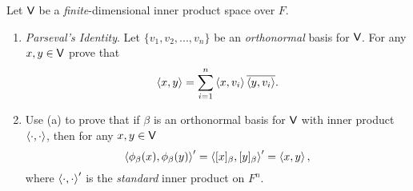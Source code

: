 \begin{exercise} \label{exercise 6.2.15}
Let \(\textsf{V}\) be a \emph{finite}-dimensional inner product space over \(F\).
\begin{enumerate}
\item \emph{Parseval's Identity}.
Let \(\{ v_1, v_2, ..., v_n \}\) be an \emph{orthonormal} basis for \(\textsf{V}\).
For any \(x, y \in \textsf{V}\) prove that
\[
    \left< x, y \right> = \sum_{i = 1}^n \left< x, v_i \right> \overline{\left< y, v_i \right>}.
\]
\item Use (a) to prove that if \(\beta\) is an orthonormal basis for \(\textsf{V}\) with inner product \(\left< \cdot, \cdot \right>\), then for any \(x, y \in \textsf{V}\)
\[
    \left< \phi_{\beta}(x), \phi_{\beta}(y) \right>' = \left< [x]_{\beta}, [y]_{\beta} \right>' = \left< x, y \right>,
\]
where \(\left< \cdot, \cdot \right>'\) is the \emph{standard} inner product on \(F^n\).
\end{enumerate}
\end{exercise}

